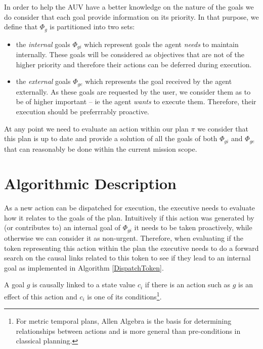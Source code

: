 In order to help the AUV have a better knowledge on the nature of the
goals we do consider that each goal provide information on its
priority. In that purpose, we define that $\Phi_g$ is partitioned into
two sets:

\begin{itemize}

\item the \emph{internal} goals $\Phi_{gi}$ which represent goals the
  agent {\em needs} to maintain internally. These goals will be
  considered as objectives that are not of the higher priority and
  therefore their actions can be deferred during execution.

\item the \emph{external} goals $\Phi_{ge}$ which represents the goal
  received by the agent externally. As these goals are requested by
  the user, we consider them as to be of higher important -- ie the
  agent {\em wants} to execute them. Therefore, their execution should
  be preferrrably proactive.

\end{itemize}

At any point we need to evaluate an action within our plan $\pi$ we
consider that this plan is up to date and provide a solution of all 
the goals of both $\Phi_{gi}$ and $\Phi_{ge}$ that can reasonably be
done within the current mission scope.

\section{Algorithmic Description}

As a new action can be dispatched for execution, the executive needs
to evaluate how it relates to the goals of the plan. Intuitively if
this action was generated by (or contributes to) an internal goal of
$\Phi_{gi}$ it needs to be taken proactively, while otherwise we can
consider it as non-urgent. Therefore, when evaluating if the token
representing this action within the plan the executive needs to do a
forward search on the causal links related to this token to see if
they lead to an internal goal as implemented in Algorithm
\ref{DispatchToken}.

\begin{definition}
\label{def:subgoalLink}
A goal $g$ is causally linked to a state value $c_i$ if there is an
action such as $g$ is an effect of this action and $c_i$ is one of its
conditions\footnote{For metric temporal plans, Allen Algebra
  \cite{allen84} is the basis for determining relationships between
  actions and is more general than pre-conditions in classical
  planning.}. 
\end{definition}

